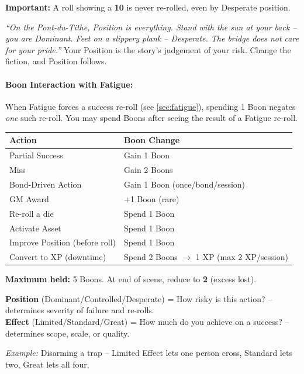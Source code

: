 \noindent \textbf{Important:} A roll showing a \textbf{10} is never re-rolled, even by Desperate position.

\begin{tcolorbox}[colback=blue!5!white,colframe=blue!75!black,title=\textit{A Vhasian Duelist's Lesson},breakable]
\emph{``On the Pont-du-Tithe, Position is everything. Stand with the sun at your back -- you are Dominant. Feet on a slippery plank -- Desperate. The bridge does not care for your pride.''}  
Your Position is the story's judgement of your risk. Change the fiction, and Position follows.
\end{tcolorbox}

\paragraph{Boon Interaction with Fatigue:} When Fatigue forces a success re-roll (see \ref{sec:fatigue}), spending 1 Boon negates \textit{one} such re-roll. You may spend Boons after seeing the result of a Fatigue re-roll.

\begin{tcolorbox}[colback=green!5!white,colframe=green!70!black,title=\textbf{Boon Economy at a Glance},breakable]
  \begin{tabular}{ll}
  \toprule
  \textbf{Action} & \textbf{Boon Change} \\
  \midrule
  Partial Success & Gain 1 Boon \\
  Miss & Gain 2 Boons \\
  Bond-Driven Action & Gain 1 Boon (once/bond/session) \\
  GM Award & +1 Boon (rare) \\
  \hline
  Re-roll a die & Spend 1 Boon \\
  Activate Asset & Spend 1 Boon \\
  Improve Position (before roll) & Spend 1 Boon \\
  Convert to XP (downtime) & Spend 2 Boons $\rightarrow$ 1 XP (max 2 XP/session) \\
  \bottomrule
  \end{tabular}
  \medskip
  \textbf{Maximum held:} 5 Boons.  
  At end of scene, reduce to \textbf{2} (excess lost).
\end{tcolorbox}

\begin{effectbox}
    \textbf{Position} (Dominant/Controlled/Desperate) = How risky is this action? -- determines severity of failure and re-rolls.\\
    \textbf{Effect} (Limited/Standard/Great) = How much do you achieve on a success? -- determines scope, scale, or quality.
    
    \vspace{4pt}
    \small
    \textit{Example:} Disarming a trap -- Limited Effect lets one person cross, Standard lets two, Great lets all four.
\end{effectbox}

